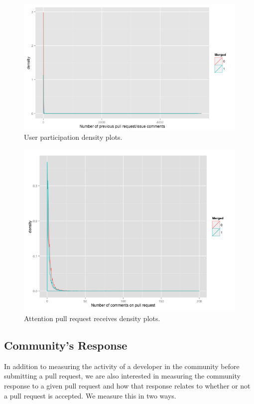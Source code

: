 \documentclass{sigchi}
\begin{document}
\begin{figure}[p] \centering
\includegraphics[scale=0.6]{figures/number_comments_density_ggplot.png}
\caption{User participation density plots.}  \label{fig:up}
\end{figure}

\begin{figure}[p] \centering
\includegraphics[scale=0.6]{figures/comments_on_pr_density_ggplot.png}
\caption{Attention pull request receives density plots.}  \label{fig:aprr}
\end{figure}

\subsection{Community's Response}
In addition to measuring the activity of a developer in the community before
submitting a pull request, we are also interested in measuring the community
response to a given pull request and how that response relates to whether or not
a pull request is accepted. We measure this in two ways.
\end{document}
